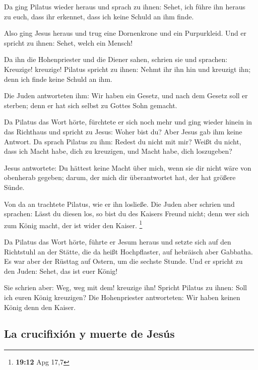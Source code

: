  Da ging Pilatus wieder heraus und sprach zu ihnen: Sehet,
ich führe ihn heraus zu euch, dass ihr erkennet, dass ich keine Schuld
an ihm finde.

 Also ging Jesus heraus und trug eine Dornenkrone und ein
Purpurkleid. Und er spricht zu ihnen: Sehet, welch ein Mensch!

 Da ihn die Hohenpriester und die Diener sahen, schrien
sie und sprachen: Kreuzige! kreuzige! Pilatus spricht zu ihnen: Nehmt
ihr ihn hin und kreuzigt ihn; denn ich finde keine Schuld an ihm.

 Die Juden antworteten ihm: Wir haben ein Gesetz, und nach
dem Gesetz soll er sterben; denn er hat sich selbst zu Gottes Sohn
gemacht.

 Da Pilatus das Wort hörte, fürchtete er sich noch mehr
 und ging wieder hinein in das Richthaus und spricht zu
Jesus: Woher bist du? Aber Jesus gab ihm keine Antwort. 
Da sprach Pilatus zu ihm: Redest du nicht mit mir? Weißt du nicht, dass
ich Macht habe, dich zu kreuzigen, und Macht habe, dich loszugeben?

 Jesus antwortete: Du hättest keine Macht über mich, wenn
sie dir nicht wäre von obenherab gegeben; darum, der mich dir
überantwortet hat, der hat größere Sünde.

 Von da an trachtete Pilatus, wie er ihn losließe. Die
Juden aber schrien und sprachen: Lässt du diesen los, so bist du des
Kaisers Freund nicht; denn wer sich zum König macht, der ist wider den
Kaiser. \footnote{\textbf{19:12} Apg 17,7}

 Da Pilatus das Wort hörte, führte er Jesum heraus und
setzte sich auf den Richtstuhl an der Stätte, die da heißt Hochpflaster,
auf hebräisch aber Gabbatha.  Es war aber der Rüsttag auf
Ostern, um die sechste Stunde. Und er spricht zu den Juden: Sehet, das
ist euer König!

 Sie schrien aber: Weg, weg mit dem! kreuzige ihn!
Spricht Pilatus zu ihnen: Soll ich euren König kreuzigen? Die
Hohenpriester antworteten: Wir haben keinen König denn den Kaiser.

\hypertarget{la-crucifixiuxf3n-y-muerte-de-jesuxfas}{%
\subsection{La crucifixión y muerte de
Jesús}\label{la-crucifixiuxf3n-y-muerte-de-jesuxfas}}

